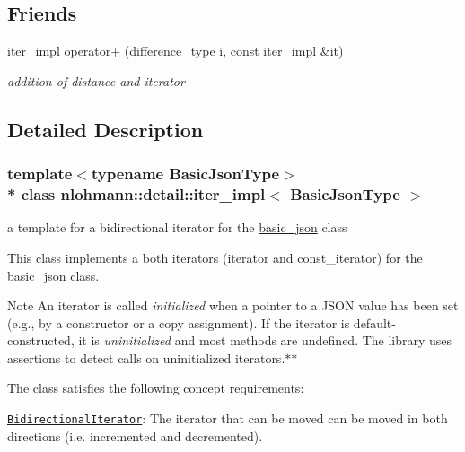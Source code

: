 \subsection*{Friends}
\begin{DoxyCompactItemize}
\item 
\hyperlink{classnlohmann_1_1detail_1_1iter__impl}{iter\+\_\+impl} \hyperlink{classnlohmann_1_1detail_1_1iter__impl_a94108d1a7563e103534f23eb5c1ee175}{operator+} (\hyperlink{classnlohmann_1_1detail_1_1iter__impl_a2f7ea9f7022850809c60fc3263775840}{difference\+\_\+type} i, const \hyperlink{classnlohmann_1_1detail_1_1iter__impl}{iter\+\_\+impl} \&it)
\begin{DoxyCompactList}\small\item\em addition of distance and iterator \end{DoxyCompactList}\end{DoxyCompactItemize}


\subsection{Detailed Description}
\subsubsection*{template$<$typename Basic\+Json\+Type$>$\\*
class nlohmann\+::detail\+::iter\+\_\+impl$<$ Basic\+Json\+Type $>$}

a template for a bidirectional iterator for the \hyperlink{classnlohmann_1_1basic__json}{basic\+\_\+json} class 

This class implements a both iterators (iterator and const\+\_\+iterator) for the \hyperlink{classnlohmann_1_1basic__json}{basic\+\_\+json} class.

\begin{DoxyNote}{Note}
An iterator is called {\itshape initialized} when a pointer to a J\+S\+ON value has been set (e.\+g., by a constructor or a copy assignment). If the iterator is default-\/constructed, it is {\itshape uninitialized} and most methods are undefined. The library uses assertions to detect calls on uninitialized iterators.$\ast$$\ast$
\end{DoxyNote}
The class satisfies the following concept requirements\+:
\begin{DoxyItemize}
\item \href{http://en.cppreference.com/w/cpp/concept/BidirectionalIterator}{\tt Bidirectional\+Iterator}\+: The iterator that can be moved can be moved in both directions (i.\+e. incremented and decremented).
\end{DoxyItemize}

